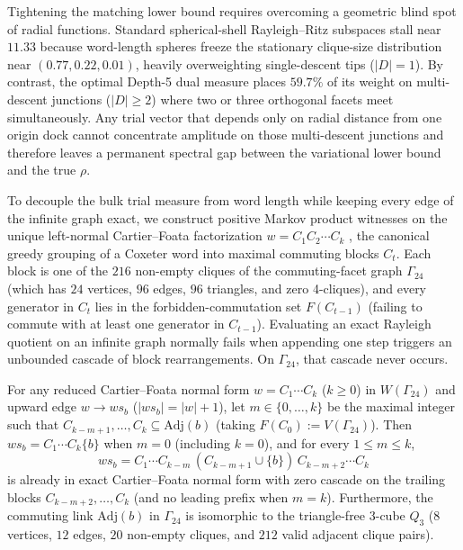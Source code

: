 Tightening the matching lower bound requires overcoming a geometric blind spot of radial functions. Standard
spherical-shell Rayleigh--Ritz subspaces stall near $11.33$ because word-length spheres freeze the stationary
clique-size distribution near $(0.77, 0.22, 0.01)$, heavily overweighting single-descent tips ($|D| = 1$). By contrast,
the optimal Depth-5 dual measure places $59.7\%$ of its weight on multi-descent junctions ($|D| \ge 2$) where two or
three orthogonal facets meet simultaneously. Any trial vector that depends only on radial distance from one origin dock
cannot concentrate amplitude on those multi-descent junctions and therefore leaves a permanent spectral gap between the
variational lower bound and the true $\rho$.

To decouple the bulk trial measure from word length while keeping every edge of the infinite graph exact, we construct
positive Markov product witnesses on the unique left-normal Cartier--Foata factorization $w = C_1 C_2 \cdots C_k$
\cite{cartier1969}, the canonical greedy grouping of a Coxeter word into maximal commuting blocks $C_t$. Each block is
one of the $216$ non-empty cliques of the commuting-facet graph $\Gamma_{24}$ (which has $24$ vertices, $96$ edges, $96$
triangles, and zero 4-cliques), and every generator in $C_t$ lies in the forbidden-commutation set $F(C_{t-1})$
(failing to commute with at least one generator in $C_{t-1}$). Evaluating an exact Rayleigh quotient on an infinite graph
normally fails when appending one step triggers an unbounded cascade of block rearrangements. On $\Gamma_{24}$, that
cascade never occurs.

\begin{theorem}
\label{thm:q3-cascade}
For any reduced Cartier--Foata normal form $w = C_1 \cdots C_k$ ($k \ge 0$) in $W(\Gamma_{24})$ and upward edge
$w \to w s_b$ ($|w s_b| = |w| + 1$), let $m \in \{0, \dots, k\}$ be the maximal integer such that
$C_{k-m+1}, \dots, C_k \subseteq \mathrm{Adj}(b)$ (taking $F(C_0) := V(\Gamma_{24})$). Then $w s_b = C_1 \cdots C_k
\{b\}$ when $m = 0$ (including $k = 0$), and for every $1 \le m \le k$,
\begin{equation}
w s_b = C_1 \cdots C_{k-m}\,(C_{k-m+1} \cup \{b\})\, C_{k-m+2} \cdots C_k
\label{eq:cf-insertion}
\end{equation}
is already in exact Cartier--Foata normal form with zero cascade on the trailing blocks $C_{k-m+2}, \dots, C_k$ (and no
leading prefix when $m = k$). Furthermore, the commuting link $\mathrm{Adj}(b)$ in $\Gamma_{24}$ is isomorphic to the
triangle-free 3-cube $Q_3$ ($8$ vertices, $12$ edges, $20$ non-empty cliques, and $212$ valid adjacent clique pairs).
\end{theorem}

